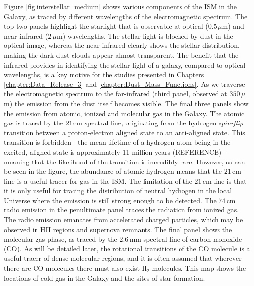 Figure \ref{fig:interstellar_medium} shows various components of the ISM in the Galaxy, as traced by different wavelengths of the electromagnetic spectrum. The top two panels highlight the starlight that is observable at optical ($0.5\,\mu$m) and near-infrared ($2\,\mu$m) wavelengths. The stellar light is blocked by dust in the optical image, whereas the near-infrared clearly shows the stellar distribution, making the dark dust clouds appear almost transparent. The benefit that the infrared provides in identifying the stellar light of a galaxy, compared to optical wavelengths, is a key motive for the studies presented in Chapters \ref{chapter:Data_Release_3} and \ref{chapter:Dust_Mass_Functions}. As we traverse the electromagnetic spectrum to the far-infrared (third panel, observed at $350\,\mu$m) the emission from the dust itself becomes visible. The final three panels show the emission from atomic, ionized and molecular gas in the Galaxy. The atomic gas is traced by the $21\,$cm spectral line, originating from the hydrogen \textit{spin-flip} transition between a proton-electron aligned state to an anti-aligned state. This transition is forbidden - the mean lifetime of a hydrogen atom being in the excited, aligned state is approximately 11 million years ({\color{red}REFERENCE}) - meaning that the likelihood of the transition is incredibly rare. However, as can be seen in the figure, the abundance of atomic hydrogen means that the $21\,$cm line is a useful tracer for gas in the ISM. The limitation of the $21\,$cm line is that it is only useful for tracing the distribution of neutral hydrogen in the local Universe where the emission is still strong enough to be detected. The $74\,$cm radio emission in the penultimate panel traces the radiation from ionized gas. The radio emission emanates from accelerated charged particles, which may be observed in HII regions and supernova remnants. The final panel shows the molecular gas phase, as traced by the $2.6\,$mm spectral line of carbon monoxide (CO). As will be detailed later, the rotational transitions of the CO molecule is a useful tracer of dense molecular regions, and it is often assumed that wherever there are CO molecules there must also exist H$_2$ molecules. This map shows the locations of cold gas in the Galaxy and the sites of star formation.

